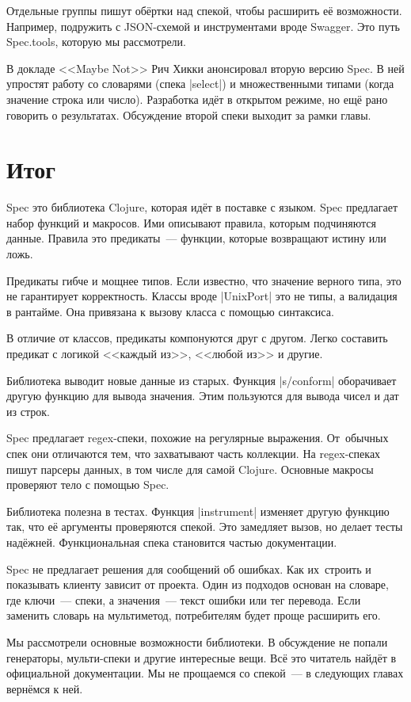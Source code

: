 Отдельные группы пишут об\"{е}ртки над спекой, чтобы расширить е\"{е}
возможности. Например, подружить с JSON-схемой и инструментами вроде
Swagger. Это путь Spec.tools, которую мы рассмотрели.


В докладе <<Maybe Not>> Рич
Хикки анонсировал вторую версию Spec. В ней упростят работу со словарями (спека
\spverb|select|) и множественными типами (когда значение строка или
число). Разработка ид\"{е}т в открытом режиме, но ещ\"{е} рано говорить о
результатах. Обсуждение второй спеки выходит за рамки главы.

\section{Итог}

Spec это библиотека Clojure, которая ид\"{е}т в поставке с языком. Spec предлагает
набор функций и макросов. Ими описывают правила, которым подчиняются
данные. Правила это предикаты~--- функции, которые возвращают истину или ложь.

Предикаты гибче и мощнее типов. Если известно, что значение верного типа, это не
гарантирует корректность. Классы вроде \spverb|UnixPort| это не типы, а
валидация в рантайме. Она привязана к вызову класса с помощью синтаксиса.

В отличие от классов, предикаты компонуются друг с другом. Легко составить
предикат с логикой <<каждый из>>, <<любой из>> и другие.

Библиотека выводит новые данные из старых. Функция \spverb|s/conform|
оборачивает другую функцию для вывода значения. Этим пользуются для вывода чисел
и дат из строк.

Spec предлагает regex-спеки, похожие на регулярные выражения. От~обычных спек
они отличаются тем, что захватывают часть коллекции. На regex-спеках пишут
парсеры данных, в том числе для самой Clojure. Основные макросы проверяют тело с
помощью Spec.

Библиотека полезна в тестах. Функция \spverb|instrument| изменяет другую функцию
так, что е\"{е} аргументы проверяются спекой. Это замедляет вызов, но делает тесты
над\"{е}жней. Функциональная спека становится частью документации.

Spec не предлагает решения для сообщений об ошибках. Как их~строить и показывать
клиенту зависит от проекта. Один из подходов основан на словаре, где ключи~---
спеки, а значения~--- текст ошибки или тег перевода. Если заменить словарь на
мультиметод, потребителям будет проще расширить его.

Мы рассмотрели основные возможности библиотеки. В обсуждение не попали
генераторы, мульти-спеки и другие интересные вещи. Вс\"{е} это читатель
найд\"{е}т в официальной документации. Мы не прощаемся со спекой~--- в следующих
главах верн\"{е}мся к ней.
